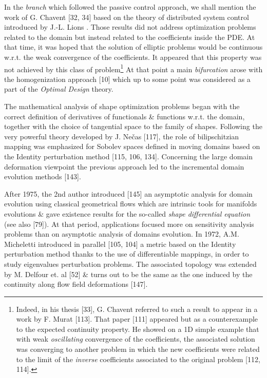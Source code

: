 \documentclass[oneside]{book}
\numberwithin{equation}{section}
\begin{document}
In the \textit{branch} which followed the passive control approach, we shall mention the work of G. Chavent [32, 34] based on the theory of distributed system control introduced by J.-L. Lions \cite{Lions1971}. Those results did not address optimization problems related to the domain but instead related to the coefficients inside the PDE. At that time, it was hoped that the solution of elliptic problems would be continuous w.r.t. the weak convergence of the coefficients. It appeared that this property was not achieved by this class of problem\footnote{Indeed, in his thesis [33], G. Chavent referred to such a result to appear in a work by F. Murat [113]. That paper [111] appeared but as a counterexample to the expected continuity property. He showed on a 1D simple example that with weak \textit{oscillating} convergence of the coefficients, the associated solution was converging to another problem in which the new coefficients were related to the limit of the \textit{inverse} coefficients associated to the original problem [112, 114].} At that point a main \textit{bifurcation} arose with the homogenization approach [10] which up to some point was considered as a part of the \textit{Optimal Design} theory.

The mathematical analysis of shape optimization problems began with the correct definition of derivatives of functionals \& functions w.r.t. the domain, together with the choice of tangential space to the family of shapes. Following the very powerful theory developed by J. Ne\v{c}as [117], the role of bilipschitzian mapping was emphasized for Sobolev spaces defined in moving domains based on the Identity perturbation method [115, 106, 134]. Concerning the large domain deformation viewpoint the previous approach led to the incremental domain evolution methods [143].

After 1975, the 2nd author introduced [145] an asymptotic analysis for domain evolution using classical geometrical flows which are intrinsic tools for manifolds evolutions \& gave existence results for the so-called \textit{shape differential equation} (see also [79]). At that period, applications focused more on sensitivity analysis problems than on asymptotic analysis of domains evolution. In 1972, A.M. Micheletti introduced in parallel [105, 104] a metric based on the Identity perturbation method thanks to the use of differentiable mappings, in order to study eigenvalues perturbation problems. The associated topology was extended by M. Delfour et. al [52] \& turns out to be the same as the one induced by the continuity along flow field deformations [147].
\end{document}
